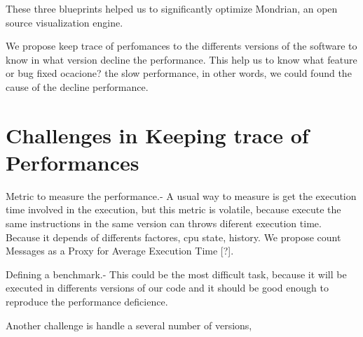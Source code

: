 \documentclass{sig-alternate}
\newcommand{\seclabel}[1]{\label{sec:#1}}
\begin{document}

These three blueprints helped us to significantly optimize Mondrian, an open source visualization engine.

We propose keep trace of perfomances to the differents versions of the software to know in what version decline the performance. This help us to know what feature or bug fixed ocacione? the slow performance, in other words, we could found the cause of the decline performance.

\section{Challenges in Keeping trace of Performances}\seclabel{problem}

Metric to measure the performance.- A usual way to measure is get the execution time involved in the execution, but this metric is volatile, because execute the same instructions in the same version can throws diferent execution time. Because it depends of differents factores, cpu state, history. We propose count Messages as a Proxy for Average Execution Time [?].

Defining a benchmark.- This could be the most difficult task, because it will be executed in differents versions of our code and it should be good enough to reproduce the performance deficience.

Another challenge is handle a several number of versions,





\end{document}
